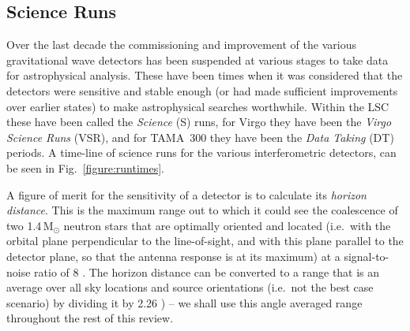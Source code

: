 \documentclass{article}
\begin{document}
\subsection{Science Runs}\label{subsection:runs}
Over the last decade the commissioning and improvement of the various
gravitational wave detectors has been suspended at various stages to take data
for astrophysical analysis. These have been times when it was considered that
the detectors were sensitive and stable enough (or had made sufficient
improvements over earlier states) to make astrophysical searches worthwhile.
Within the LSC these have been called the {\it Science} (S) runs, for Virgo they
have been the {\it Virgo Science Runs} (VSR), and for TAMA~300 they have been
the {\it Data Taking} (DT) periods. A time-line of science runs for the various
interferometric detectors, can be seen in Fig.~\ref{figure:runtimes}.


A figure of merit for the sensitivity of a detector is to calculate its {\it 
horizon distance}. This is the maximum range out to which it could see the
coalescence of two 1.4\,M$_{\odot}$ neutron stars that are optimally oriented
and located (i.e.~with the orbital plane perpendicular to the line-of-sight, and
with this plane parallel to the detector plane, so that the antenna response is
at its maximum) at a signal-to-noise ratio of 8 \cite{Abbott:2005b}. The horizon
distance can be converted to a range that is an average over all sky locations
and source orientations (i.e.~not the best case scenario) by dividing it by 2.26
\cite{Sutton:2003}) -- we shall use this angle averaged range throughout the
rest of this review.
\end{document}
